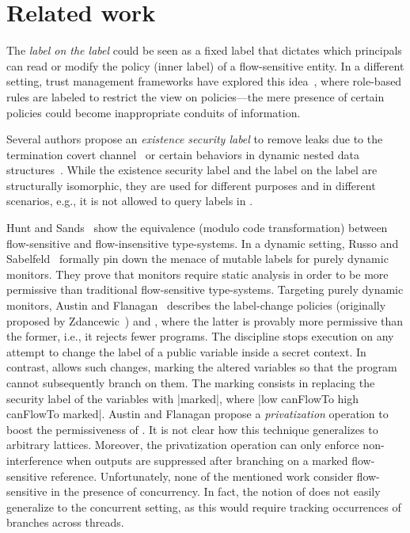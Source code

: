 \section{Related work}
\label{sec:related}

The \emph{label on the label} could be seen as a fixed label that dictates which
principals can read or modify the policy (inner label) of a flow-sensitive
entity. In a different setting, trust management frameworks have
explored this idea~\cite{4556677}, where role-based rules are labeled to
restrict the view on policies---the mere presence of certain policies could
become inappropriate conduits of information. 

Several authors propose an
\emph{existence security label} to remove leaks due to the termination covert
channel~\cite{DBLP:conf/csfw/RafnssonHS12,Rafnson:2013} or certain behaviors
in dynamic nested data structures~\cite{Russo:2009,DBLP:conf/csfw/HedinS12}. While the
existence security label and the label on the label are structurally isomorphic,
they are used for different purposes and in different scenarios, e.g., it is not
allowed to query labels in
\cite{Russo:2009,DBLP:conf/csfw/HedinS12,DBLP:conf/csfw/RafnssonHS12,Rafnson:2013}.

Hunt and Sands~\citep{Hunt:2006} show the equivalence (modulo code
transformation) between flow-sensitive and flow-insensitive type-systems. 
In a dynamic setting, Russo and Sabelfeld~\citep{Russo:2010} formally pin down
the menace of mutable labels for purely dynamic monitors. They prove that
monitors require static analysis in order to be more permissive than traditional
flow-sensitive type-systems. Targeting purely dynamic monitors, Austin and
Flanagan~\citep{Austin:Flanagan:PLAS09,Austin:Flanagan:PLAS10} describes the
label-change policies \emph{\nsu} (originally proposed by
  Zdancewic~\cite{Zdancewic02programminglanguages}) and \emph{\pu}, where the
latter is provably more permissive than the former, i.e., it rejects fewer
programs. The {\nsu} discipline stops execution on any attempt to change the
label of a public variable inside a secret context. In contrast, {\pu} allows
such changes, marking the altered variables so that the program cannot
subsequently branch on them. The marking consists in replacing the security
label of the variables with |marked|, where |low canFlowTo high canFlowTo
marked|.  Austin and Flanagan propose a \emph{privatization} operation to boost
the permissiveness of {\pu}.  It is not clear how this technique generalizes to
arbitrary lattices. Moreover, the privatization operation can only enforce
non-interference when outputs are suppressed after branching on a marked
flow-sensitive reference. Unfortunately, none of the mentioned work 
consider flow-sensitive in the presence of concurrency.
In fact, the notion of {\pu} does not easily generalize to
the concurrent setting, as this would require tracking occurrences
of branches across threads.

